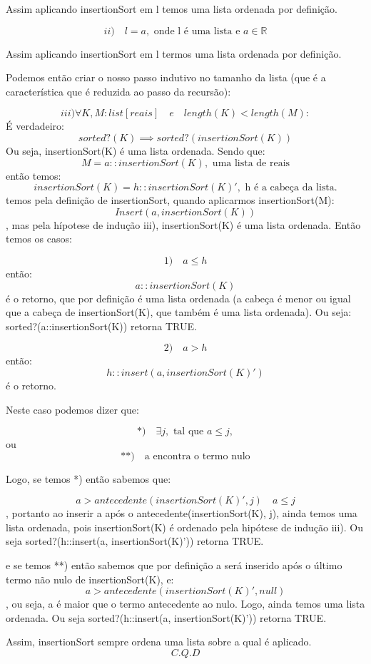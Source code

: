 \documentclass[a4paper, 10pt]{article}
\begin{document}
Assim aplicando insertionSort em l temos uma lista ordenada por definição.

$$ii)\quad l = a, \mbox{ onde l é uma lista e } a \in \mathbb{R} $$ 

Assim aplicando insertionSort em l termos uma lista ordenada por definição. 

Podemos então criar o nosso passo indutivo no tamanho da lista (que é a característica que é reduzida ao passo da recursão):

$$iii) \forall{K, M: list[reais]}\quad e \quad length(K) < length(M): $$
É verdadeiro:
$$ sorted?(K)  \implies sorted?(insertionSort(K)) $$
Ou seja, insertionSort(K) é uma lista ordenada.
Sendo que:
$$ M = a::insertionSort(K), \mbox{ uma lista de reais} $$ 
então temos:
$$ insertionSort(K) = h::insertionSort(K)', \mbox{ h é a cabeça da lista.}$$
temos pela definição de insertionSort, quando aplicarmos insertionSort(M):
$$ Insert(a, insertionSort(K)) $$,
mas pela hípotese de indução iii), insertionSort(K) é uma lista ordenada. Então temos os casos:

$$1) \quad a \leq h $$ 
então:
$$ a::insertionSort(K) $$ é o retorno, que por definição é uma lista ordenada (a cabeça é menor ou igual que a cabeça de insertionSort(K), que também é uma lista ordenada). Ou seja: sorted?(a::insertionSort(K)) retorna TRUE. 

$$2) \quad a > h $$ 
então:
$$ h::insert(a, insertionSort(K)') $$ é o retorno. 

Neste caso podemos dizer que:

$$*)\quad \exists{j}, \mbox{ tal que } a \leq j,$$ 
ou
$$**)\quad \mbox{a encontra o termo nulo} $$ 

Logo, se temos *) então sabemos que:

$$ a > antecedente(insertionSort(K)', j) \quad a \leq j $$, portanto ao inserir a após o antecedente(insertionSort(K), j), ainda temos uma lista ordenada, pois insertionSort(K) é ordenado pela hipótese de indução iii). Ou seja sorted?(h::insert(a, insertionSort(K)')) retorna TRUE.

e se temos **) então sabemos que por definição a será inserido após o último termo não nulo de insertionSort(K), e:
$$ a > antecedente(insertionSort(K)', null) $$, ou seja, a é maior que o termo antecedente ao nulo. Logo, ainda temos uma lista ordenada. Ou seja sorted?(h::insert(a, insertionSort(K)')) retorna TRUE.

Assim, insertionSort sempre ordena uma lista sobre a qual é aplicado. 
$$C.Q.D$$
\end{document}
